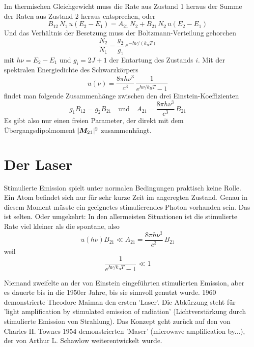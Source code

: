 Im thermischen Gleichgewicht muss die Rate aus Zustand 1 heraus  der Summe der Raten aus Zustand 2 heraus entsprechen, 
oder 
\begin{equation}
    B_{12} \, N_1 \, u(E_2 - E_1) =   A_{21} \, N_2 + B_{21} \, N_2 \, u(E_2 - E_1) 
\end{equation}
Und das Verhältnis der Besetzung muss der Boltzmann-Verteilung gehorchen
\begin{equation}
    \frac{N_2}{N_1} = \frac{g_2}{g_1} \, e^{- h \nu / (k_B T)}
\end{equation}
mit $h \nu = E_2 - E_1$ und $g_i = 2J +1$ der Entartung des Zustands $i$. Mit der spektralen Energiedichte des Schwarzkörpers 
\begin{equation}
    u(\nu) = \frac{8 \pi h \nu^3}{c^3} \,  \frac{1}{e^{h\nu/k_B T} -1}
\end{equation}
findet man folgende Zusammenhänge zwischen den drei Einstein-Koeffizienten
\begin{equation}
   g_1 B_{12}  = g_2 B_{21} \quad \text{und} \quad
   A_{21} = \frac{8 \pi h \nu^3}{c^3}\, B_{21} 
\end{equation}
Es gibt also nur einen freien Parameter, der direkt mit dem Übergangsdipolmoment $|\boldsymbol{M}_{21}|^2$ zusammenhängt.


\section{Der Laser}

Stimulierte Emission spielt unter normalen Bedingungen praktisch keine Rolle. Ein Atom befindet sich nur für sehr kurze Zeit im angeregten Zustand. Genau in diesem Moment müsste ein geeignetes stimulierendes Photon vorhanden sein. Das ist selten. Oder umgekehrt: In den allermeisten Situationen ist die stimulierte Rate viel kleiner als die spontane, also 
\begin{equation}
    u(h\nu)  B_{21}  \ll A_{21} = \frac{8 \pi h \nu^3}{c^3} \, B_{21} 
\end{equation}
weil 
\begin{equation}
    \frac{1}{e^{h\nu/k_B T} -1} \ll 1
\end{equation}

Niemand zweifelte an der von Einstein eingeführten stimulierten Emission, aber es dauerte bis in die 1950er Jahre, bis sie sinnvoll genutzt wurde. 1960 demonstrierte Theodore Maiman den ersten 'Laser'. Die Abkürzung steht für 'light amplification by stimulated emission of radiation' (Lichtverstärkung durch stimulierte Emission von Strahlung). Das Konzept geht zurück auf den von Charles H. Townes 1954 demonstrierten 'Maser' (microwave amplification by...), der von Arthur L. Schawlow weiterentwickelt wurde.


